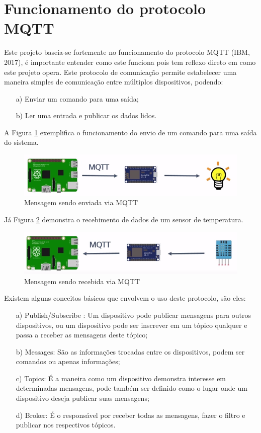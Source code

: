\section{Funcionamento do protocolo MQTT}
Este projeto baseia-se fortemente no funcionamento do protocolo MQTT (IBM, 2017), é importante entender como este funciona pois tem reflexo direto em como este projeto opera. Este protocolo de comunicação permite estabelecer uma maneira simples de comunicação entre múltiplos dispositivos, podendo:

\begin{itemize}
    \item[a)] Enviar um comando para uma saída;
    \item[b)] Ler uma entrada e publicar os dados lidos.
\end{itemize}

A Figura \ref{mqtt-1} exemplifica o funcionamento do envio de um comando para uma saída do sistema.

\begin{figure}[H]
\caption{\label{mqtt-1} Mensagem sendo enviada via MQTT}
\includegraphics[scale=0.5]{img/mqtt-1.png}
\end{figure}

Já Figura \ref{mqtt-2} demonstra o recebimento de dados de um sensor de temperatura.

\begin{figure}[H]
\caption{\label{mqtt-2} Mensagem sendo recebida via MQTT}
\includegraphics[scale=0.5]{img/mqtt-2.png}
\end{figure}

Existem alguns conceitos básicos que envolvem o uso deste protocolo, são eles:

\begin{itemize}
    \item[a)] Publish/Subscribe : Um dispositivo pode publicar mensagens para outros dispositivos, ou um dispositivo pode ser inscrever em um tópico qualquer e passa a receber as mensagens deste tópico;
    \item[b)] Messages: São as informações trocadas entre os dispositivos, podem ser comandos ou apenas informações;
    \item[c)] Topics: É a maneira como um dispositivo demonstra interesse em determinadas mensagens, pode também ser definido como o lugar onde um dispositivo deseja publicar suas mensagens;
    \item[d)] Broker: É o responsável por receber todas as mensagens, fazer o filtro e publicar nos respectivos tópicos.
\end{itemize}

